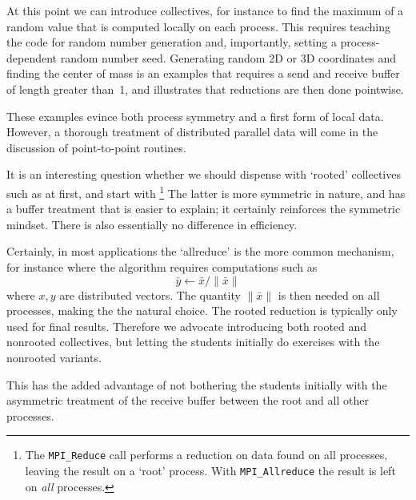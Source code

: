 At this point we can introduce collectives, for instance to find the maximum
of a random value that is computed locally on each process. This requires teaching
the code for random number generation and, importantly, setting a process-dependent
random number seed.
Generating random 2D or 3D coordinates and finding the center of mass
is an examples that requires a send and receive buffer of length greater than~1,
and illustrates that reductions are then done pointwise.

These examples evince both process symmetry and a first form
of local data. However, a thorough treatment of distributed parallel data
will come in the discussion of point-to-point routines.

It is an interesting question whether we should dispense with `rooted'
collectives such as  at first, and start with
\footnote{The {\tt MPI\_Reduce} call performs a
  reduction on data found on all processes, leaving the result on a
  `root' process. With {\tt MPI\_Allreduce} the result is left on
  \emph{all} processes.}
The latter is more symmetric in nature, and has a
buffer treatment that is easier to explain; it certainly reinforces
the symmetric mindset.
There is also essentially no difference in efficiency.
\begin{comment}
  To this author, there are few reasons to prefer
  {\small
\begin{verbatim}
MPI_Reduce( indata,outdata, /* root= */ 0 );
if (myprocno==0)
  printf("The result is .... ",outdata);
\end{verbatim}
  }
  over
  {\small
\begin{verbatim}
MPI_Allreduce( indata,outdata );
if (myprocno==0)
  printf("The result is .... ",outdata);
\end{verbatim}
  }
\end{comment}

Certainly, in most applications the `allreduce' is the more common
mechanism, for instance where the algorithm requires computations such
as 
\[ \bar y \leftarrow \bar x/\| \bar x\| \]
where $x,y$ are distributed vectors. The quantity $\|\bar x\|$ is then
needed on all processes, making the  the natural choice.
The rooted reduction is typically only used for
final results. Therefore we advocate introducing both rooted and
nonrooted collectives, but letting the students initially do
exercises with the nonrooted variants.

This has the added advantage of not bothering the students initially
with the asymmetric treatment of the receive buffer between the root
and all other processes.

